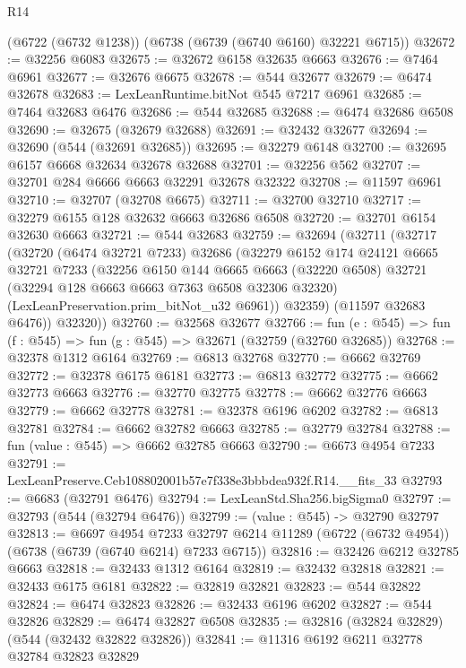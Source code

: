 \begin{lexlean}{R14}
\begin{coremodule}
    (@6722 (@6732 @1238))
    (@6738 (@6739 (@6740 @6160) @32221 @6715))
@32672 := @32256 @6083
@32675 := @32672 @6158 @32635 @6663
@32676 := @7464 @6961
@32677 := @32676 @6675
@32678 := @544 @32677
@32679 := @6474 @32678
@32683 := LexLeanRuntime.bitNot @545 @7217 @6961
@32685 := @7464 @32683 @6476
@32686 := @544 @32685
@32688 := @6474 @32686 @6508
@32690 := @32675 (@32679 @32688)
@32691 := @32432 @32677
@32694 := @32690 (@544 (@32691 @32685))
@32695 := @32279 @6148
@32700 := @32695 @6157 @6668 @32634 @32678 @32688
@32701 := @32256 @562
@32707 := @32701 @284 @6666 @6663 @32291 @32678 @32322
@32708 := @11597 @6961
@32710 := @32707 (@32708 @6675)
@32711 := @32700 @32710
@32717 := @32279 @6155 @128 @32632 @6663 @32686 @6508
@32720 := @32701 @6154 @32630 @6663
@32721 := @544 @32683
@32759 := @32694
    (@32711
      (@32717
        (@32720
          (@6474 @32721 @7233)
          @32686
          (@32279
            @6152
            @174
            @24121
            @6665
            @32721
            @7233
            (@32256
              @6150
              @144
              @6665
              @6663
              (@32220 @6508)
              @32721
              (@32294 @128 @6663 @6663 @7363 @6508 @32306 @32320)
              (LexLeanPreservation.prim_bitNot_u32 @6961))
            @32359)
          (@11597 @32683 @6476))
        @32320))
@32760 := @32568 @32677
@32766 := fun (e : @545) => fun (f : @545) => fun (g : @545) => @32671 (@32759 (@32760 @32685))
@32768 := @32378 @1312 @6164
@32769 := @6813 @32768
@32770 := @6662 @32769
@32772 := @32378 @6175 @6181
@32773 := @6813 @32772
@32775 := @6662 @32773 @6663
@32776 := @32770 @32775
@32778 := @6662 @32776 @6663
@32779 := @6662 @32778
@32781 := @32378 @6196 @6202
@32782 := @6813 @32781
@32784 := @6662 @32782 @6663
@32785 := @32779 @32784
@32788 := fun (value : @545) => @6662 @32785 @6663
@32790 := @6673 @4954 @7233
@32791 := LexLeanPreserve.Ceb108802001b57e7f338e3bbbdea932f.R14.__fits_33
@32793 := @6683 (@32791 @6476)
@32794 := LexLeanStd.Sha256.bigSigma0
@32797 := @32793 (@544 (@32794 @6476))
@32799 := (value : @545) -> @32790 @32797
@32813 := @6697
    @4954
    @7233
    @32797
    @6214
    @11289
    (@6722 (@6732 @4954))
    (@6738 (@6739 (@6740 @6214) @7233 @6715))
@32816 := @32426 @6212 @32785 @6663
@32818 := @32433 @1312 @6164
@32819 := @32432 @32818
@32821 := @32433 @6175 @6181
@32822 := @32819 @32821
@32823 := @544 @32822
@32824 := @6474 @32823
@32826 := @32433 @6196 @6202
@32827 := @544 @32826
@32829 := @6474 @32827 @6508
@32835 := @32816 (@32824 @32829) (@544 (@32432 @32822 @32826))
@32841 := @11316 @6192 @6211 @32778 @32784 @32823 @32829

\end{coremodule}
\end{lexlean}
